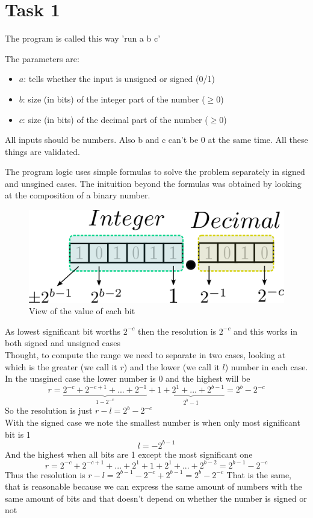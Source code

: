 \newpage

\section*{Task 1}

The program is called this way 'run a b c'

The parameters are:
\begin{itemize}
  \item $a$: tells whether the input is unsigned or signed (0/1)
  \item $b$: size (in bits) of the integer part of the number ($\geq0$)
  \item $c$: size (in bits) of the decimal part of the number ($\geq0$)
\end{itemize}
All inputs should be numbers. Also b and c can't be 0 at the same time.
All these things are validated.

The program logic uses simple formulas to solve the problem separately in signed and unsgined cases.
The inituition beyond the formulas was obtained by looking at the composition of a binary number.
\begin{figure}[H]
  \begin{centering}
  \includegraphics[scale=1]{data/bits.png}
  \par\end{centering}
  \caption{View of the value of each bit}
\end{figure}
As lowest significant bit worths $2^{-c}$ then the resolution is $2^{-c}$ and this works in both signed and unsigned cases
\\
Thought, to compute the range we need to separate in two cases, looking at which is the greater (we call it $r$) and the lower (we call it $l$) number in each case.
In the unsgined case the lower number is 0 and the highest will be
$$r=\underbrace{2^{-c}+2^{-c+1}+...+2^{-1}}_{1-2^{-c}}+\underbrace{1+2^{1}+...+2^{b-1}}_{2^{b}-1}=2^{b}-2^{-c}$$
So the resolution is just $r-l=2^{b}-2^{-c}$
\\
With the signed case we note the smallest number is when only most significant bit is 1
$$l=-2^{b-1} $$
And the highest when all bits are 1 except the most significant one
$$r=2^{-c}+2^{-c+1}+...+2^{1}+1+2^{1}+...+2^{b-2}=2^{b-1}-2^{-c}$$
Thus the resolution is $r-l=2^{b-1}-2^{-c}+2^{b-1}=2^{b}-2^{-c}$
That is the same, that is reasonable because we can express the same amount of numbers with the same amount of bits and that doesn't depend on whether the number is signed or not

